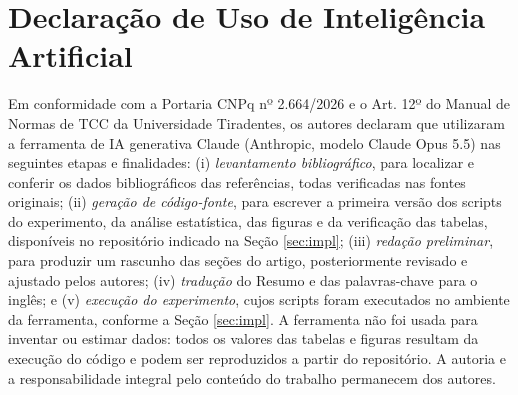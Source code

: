 \documentclass[a4paper,12pt]{article}
\begin{document}
\section*{Declaração de Uso de Inteligência Artificial}
\noindent Em conformidade com a Portaria CNPq nº 2.664/2026 e o Art. 12º do Manual de Normas de TCC da Universidade Tiradentes, os autores declaram que utilizaram a ferramenta de IA generativa Claude (Anthropic, modelo Claude Opus 5.5) nas seguintes etapas e finalidades: (i) \emph{levantamento bibliográfico}, para localizar e conferir os dados bibliográficos das referências, todas verificadas nas fontes originais; (ii) \emph{geração de código-fonte}, para escrever a primeira versão dos scripts do experimento, da análise estatística, das figuras e da verificação das tabelas, disponíveis no repositório indicado na Seção \ref{sec:impl}; (iii) \emph{redação preliminar}, para produzir um rascunho das seções do artigo, posteriormente revisado e ajustado pelos autores; (iv) \emph{tradução} do Resumo e das palavras-chave para o inglês; e (v) \emph{execução do experimento}, cujos scripts foram executados no ambiente da ferramenta, conforme a Seção \ref{sec:impl}. A ferramenta não foi usada para inventar ou estimar dados: todos os valores das tabelas e figuras resultam da execução do código e podem ser reproduzidos a partir do repositório. A autoria e a responsabilidade integral pelo conteúdo do trabalho permanecem dos autores.
\end{document}

